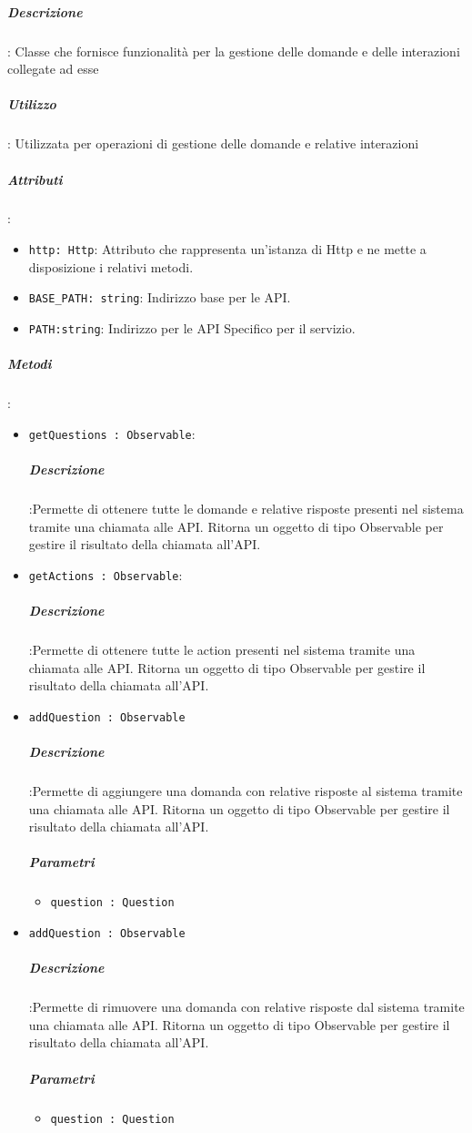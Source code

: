 \documentclass[../DefinizioneDiProdotto_v3.0.0.tex]{subfiles}
\begin{document}
					\subparagraph{Descrizione}: Classe che fornisce funzionalità per la gestione delle domande e delle interazioni collegate ad esse
					\subparagraph{Utilizzo}: Utilizzata per operazioni di gestione delle domande e relative interazioni
					\subparagraph{Attributi}:
			      	\begin{itemize}
						\item \texttt{http: Http}: Attributo che rappresenta un'istanza di Http e ne mette a disposizione i relativi metodi.
						\item \texttt{BASE\_PATH: string}: Indirizzo base per le API.
						\item \texttt{PATH:string}: Indirizzo per le API Specifico per il servizio.
			      	\end{itemize}
					\subparagraph{Metodi}:
	      	      	\begin{itemize}
						\item \texttt{getQuestions : Observable}:
						\subparagraph{Descrizione}:Permette di ottenere tutte le domande e relative risposte presenti nel sistema tramite una chiamata alle API. Ritorna un oggetto di tipo Observable per gestire il risultato della chiamata all'API.

						\item \texttt{getActions : Observable}:
						\subparagraph{Descrizione}:Permette di ottenere tutte le action presenti nel sistema tramite una chiamata alle API. Ritorna un oggetto di tipo Observable per gestire il risultato della chiamata all'API.


						\item \texttt{addQuestion : Observable}
						\subparagraph{Descrizione}:Permette di aggiungere una domanda con relative risposte al sistema tramite una chiamata alle API. Ritorna un oggetto di tipo Observable per gestire il risultato della chiamata all'API.
						\subparagraph{Parametri}\begin{itemize}
							\item \texttt{question : Question}
						\end{itemize}

						\item \texttt{addQuestion : Observable}
						\subparagraph{Descrizione}:Permette di rimuovere una domanda con relative risposte dal sistema tramite una chiamata alle API. Ritorna un oggetto di tipo Observable per gestire il risultato della chiamata all'API.
						\subparagraph{Parametri}\begin{itemize}
							\item \texttt{question : Question}
						\end{itemize}

						
	      	      	\end{itemize}
\newpage
\end{document}
